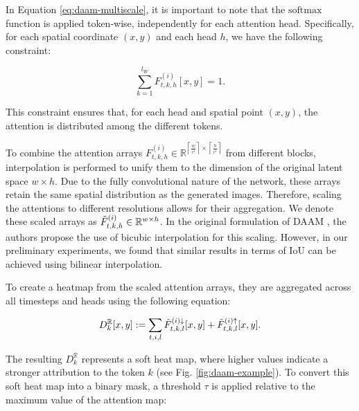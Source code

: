 In Equation \ref{eq:daam-multiscale}, it is important to note that the $\text{softmax}$ function is applied token-wise, independently for each attention head. Specifically, for each spatial coordinate $(x, y)$ and each head $h$, we have the following constraint:

\begin{equation}
    \label{eq:softmax-constraint}
    \sum_{k=1}^{l_W} F_{t, k, h}^{(i)}[x, y] = 1.
\end{equation}

This constraint ensures that, for each head and spatial point $(x, y)$, the attention is distributed among the different tokens.



To combine the attention arrays $F_{t, k, h}^{(i)} \in \mathbb{R}^{\left \lceil \frac{w}{c^i} \right \rceil \times \left \lceil \frac{h}{c^i} \right \rceil}$ from different blocks, interpolation is performed to unify them to the dimension of the original latent space $w \times h$. Due to the fully convolutional nature of the network, these arrays retain the same spatial distribution as the generated images. Therefore, scaling the attentions to different resolutions allows for their aggregation. We denote these scaled arrays as $\Tilde{F}_{t, k, h}^{(i)} \in \mathbb{R}^{w \times h}$. In the original formulation of DAAM \cite{DAAM}, the authors propose the use of bicubic interpolation for this scaling. However, in our preliminary experiments, we found that similar results in terms of IoU can be achieved using bilinear interpolation.


To create a heatmap from the scaled attention arrays, they are aggregated across all timesteps and heads using the following equation:

\begin{equation}
\label{eq:daam-summing}
    D_k^{\mathbb{R}}[x, y] := \sum_{t, i, l} \Tilde{F}_{t, k, l}^{(i) \downarrow}[x,y] + \Tilde{F}_{t, k, l}^{(i) \uparrow}[x,y].
\end{equation}

The resulting $D_k^{\mathbb{R}}$ represents a soft heat map, where higher values indicate a stronger attribution to the token $k$ (see Fig. \ref{fig:daam-example}). To convert this soft heat map into a binary mask, a threshold $\tau$ is applied relative to the maximum value of the attention map:

